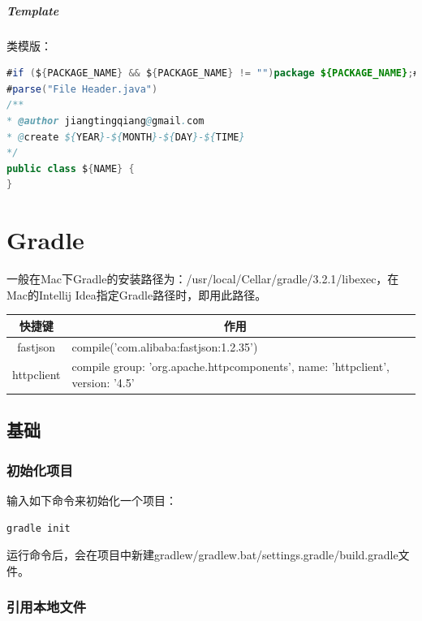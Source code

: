 \documentclass[letter]{book}
\begin{document}
\paragraph{Template}

类模版：

\begin{lstlisting}[language=Java]
#if (${PACKAGE_NAME} && ${PACKAGE_NAME} != "")package ${PACKAGE_NAME};#end
#parse("File Header.java")
/**
* @author jiangtingqiang@gmail.com
* @create ${YEAR}-${MONTH}-${DAY}-${TIME}
*/
public class ${NAME} {
}
\end{lstlisting}



\chapter{Gradle}

一般在Mac下Gradle的安装路径为：/usr/local/Cellar/gradle/3.2.1/libexec，在Mac的Intellij Idea指定Gradle路径时，即用此路径。

\begin{tabular}{cp{10cm}c}
	\hline
	\multirow{1}{*}{快捷键}
	& \multicolumn{1}{c}{作用}  \\
	\hline			
	fastjson & compile('com.alibaba:fastjson:1.2.35') \\
	httpclient & compile group: 'org.apache.httpcomponents', name: 'httpclient', version: '4.5'\\
	\hline
\end{tabular}

\section{基础}

\subsection{初始化项目}

输入如下命令来初始化一个项目：

\begin{lstlisting}[language=Java]
gradle init
\end{lstlisting}

运行命令后，会在项目中新建gradlew/gradlew.bat/settings.gradle/build.gradle文件。

\subsection{引用本地文件}
\end{document}
